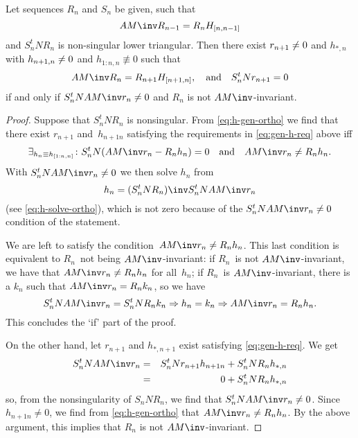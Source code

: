 \documentclass[11pt]{artikel3}
\begin{document}
\begin{Outline}
\begin{lemma}
\label{lemma:next-r}
Let sequences $R_n$ and $S_n$ be given, such that
\[ AM\inv R_{n-1}=R_nH_{[n,n-1]} \]
and $S_n^tN R_n$ is non-singular lower triangular.
Then there exist $r_{n+1}\not=\nobreak0$ and $h_{*,n}$ 
with $h_{n+1,n}\not=\nobreak0$ and $h_{1:n,n}\not\equiv0$
such that
\begin{equation}
    AM\inv R_n=R_{n+1}H_{[n+1,n]},\quad\hbox{and}\quad S_n^tN r_{n+1}=0
    \label{eq:gen-h-req}\end{equation}
if and only if $S_n^tN AM\inv r_n\not=0$ and
$R_n$ is not $AM\inv$-invariant.
\end{lemma}

\begin{proof} Suppose that $S_n^tN R_n$ is nonsingular.
From \eqref{eq:h-gen-ortho} we find that
there exist $r_{n+1}$ and~$h_{n+1n}$ satisfying the
requirements in \eqref{eq:gen-h-req} above iff
\[ \exists_{h_n\equiv h_{[1:n,n]}}\colon
    S_n^tN(AM\inv r_n-R_nh_n)=0 \quad\hbox{and}\quad
    AM\inv r_n\not=R_nh_n. \]
With $S_n^tN AM\inv r_n\not=0$ we then solve $h_n$ from
\begin{equation} h_n= (S_n^tN R_n)\inv S_n^tN AM\inv r_n
    \label{eq:solve-next-h}\end{equation}
(see \eqref{eq:h-solve-ortho}),
which is not zero because of the $S_n^tN AM\inv r_n\not=0$
condition of the statement.

We are left to satisfy the condition~$AM\inv r_n\not=\nobreak R_nh_n$.
This last condition is equivalent to $R_n$~not being $AM\inv$-invariant:
if $R_n$~is not $AM\inv$-invariant, we have that 
$AM\inv r_n\not=R_nh_n$ for all~$h_n$;
if $R_n$~is $AM\inv$-invariant, there is a $k_n$ 
such that $AM\inv r_n=R_nk_n$, so we have
\[ S_n^tN AM\inv r_n=S_n^tN R_nk_n \Rightarrow 
    h_n=k_n \Rightarrow AM\inv r_n=R_nh_n. \]
This concludes the `if' part of the proof.

On the other hand, let $r_{n+1}$ and $h_{*,n+1}$ exist satisfying
\eqref{eq:gen-h-req}. We get
\begin{eqnarray*}S_n^tN AM\inv r_n&=&
    S_n^tN r_{n+1}h_{n+1n}+S_n^tN R_nh_{*,n}\\
    &=&0+S_n^tN R_nh_{*,n}\end{eqnarray*}
so, from the nonsingularity of $S_nN R_n$,
we find that $S_n^tN AM\inv r_n\not=0$.
Since $h_{n+1n}\not=0$, we find from \eqref{eq:h-gen-ortho} that
$AM\inv r_n\not=\nobreak R_nh_n$. By the above argument,
this implies that $R_n$ is not $AM\inv$-invariant.
\end{proof}


\end{Outline}
\end{document}
